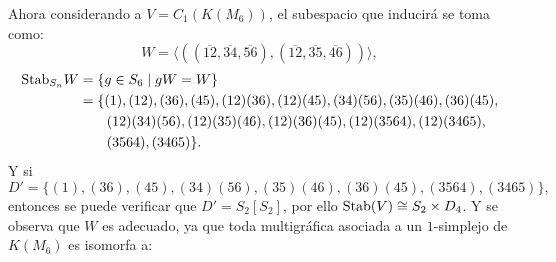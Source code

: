 \documentclass[12pt]{book}
\theoremstyle{definition}
\newcounter{in}
\begin{document}
Ahora considerando a $V = C_{1}(K(M_6))$, el subespacio que inducirá
se toma como:
\begin{equation}
W = \langle( (\overline{12},\overline{34},\overline{56}),(\overline{12},\overline{35},\overline{46}))\rangle,
\end{equation}
  \begin{equation*}
    \begin{aligned}
      \textup{Stab}_{S_{n}} W &=\{g\in S_{6}\mid gW=W\}\\
      &=\{(1),(12),(36),(45),(12)(36),(12)(45),(34)(56),(35)(46),(36)(45),\\
      &\qquad{}(12)(34)(56),(12)(35)(46),(12)(36)(45),(12)(3564),(12)(3465), \\
      &\qquad{}(3564),(3465)\}.
    \end{aligned}
\end{equation*}
Y si
\begin{equation*}
      D' =\{(1),(36),(45),(34)(56),(35)(46),(36)(45),(3564),(3465)\},
\end{equation*}
entonces se puede verificar que $D' = S_{2} \left [ S_{2} \right ]$,
por ello $\textup{Stab}(V) \cong S_{2} \times D_{4}$.  Y se observa que $W$ es adecuado, ya que toda multigráfica asociada a un $1$-simplejo de $K(M_{6})$ es isomorfa a:
\begin{center}
\end{center}
\end{document}
